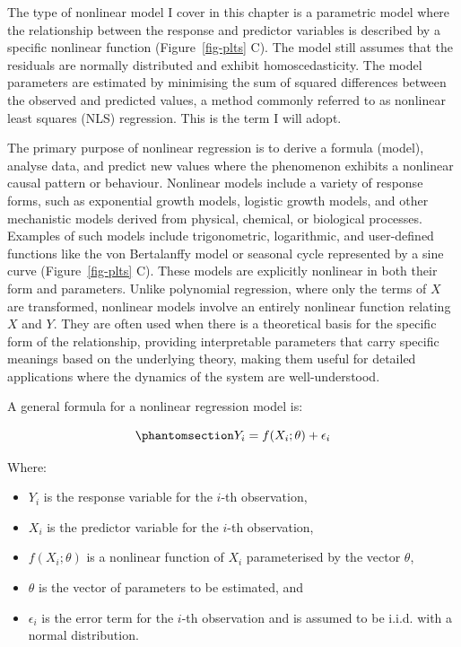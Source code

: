 \documentclass[
  letterpaper,
]{book}
\providecommand{\tightlist}{%
  \setlength{\itemsep}{0pt}\setlength{\parskip}{0pt}}\usepackage{longtable,booktabs,array}
\begin{document}
The type of nonlinear model I cover in this chapter is a parametric
model where the relationship between the response and predictor
variables is described by a specific nonlinear function
(Figure~\ref{fig-plts} C). The model still assumes that the residuals
are normally distributed and exhibit homoscedasticity. The model
parameters are estimated by minimising the sum of squared differences
between the observed and predicted values, a method commonly referred to
as nonlinear least squares (NLS) regression. This is the term I will
adopt.

The primary purpose of nonlinear regression is to derive a formula
(model), analyse data, and predict new values where the phenomenon
exhibits a nonlinear causal pattern or behaviour.
Nonlinear models include a variety of response forms, such as
exponential growth models, logistic growth models, and other mechanistic
models derived from physical, chemical, or biological processes.
Examples of such models include trigonometric, logarithmic, and
user-defined functions like the von Bertalanffy model or seasonal cycle
represented by a sine curve (Figure~\ref{fig-plts} C). These models are
explicitly nonlinear in both their form and parameters. Unlike
polynomial regression, where only the terms of \(X\) are transformed,
nonlinear models involve an entirely nonlinear function relating \(X\)
and \(Y\). They are often used when there is a theoretical basis for the
specific form of the relationship, providing interpretable parameters
that carry specific meanings based on the underlying theory, making them
useful for detailed applications where the dynamics of the system are
well-understood.

A general formula for a nonlinear regression model is:

\begin{equation}\phantomsection\label{eq-nonlin}{Y_i = f(X_i; \theta) + \epsilon_i}\end{equation}

Where:

\begin{itemize}
\tightlist
\item
  \(Y_i\) is the response variable for the \(i\)-th observation,
\item
  \(X_i\) is the predictor variable for the \(i\)-th observation,
\item
  \(f(X_i; \theta)\) is a nonlinear function of \(X_i\) parameterised by
  the vector \(\theta\),
\item
  \(\theta\) is the vector of parameters to be estimated, and
\item
  \(\epsilon_i\) is the error term for the \(i\)-th observation and is
  assumed to be i.i.d. with a normal distribution.
\end{itemize}
\end{document}
